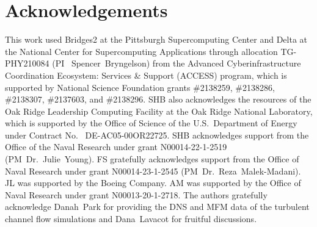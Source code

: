 \documentclass[11pt,sort&compress]{elsarticle}
\begin{document}
\section*{Acknowledgements}

This work used Bridges2 at the Pittsburgh Supercomputing Center and Delta at the National Center for Supercomputing Applications through allocation TG-PHY210084 (PI~ Spencer~Bryngelson) from the Advanced Cyberinfrastructure Coordination Ecosystem: Services \& Support (ACCESS) program, which is supported by National Science Foundation grants \#2138259, \#2138286, \#2138307, \#2137603, and \#2138296.
SHB also acknowledges the resources of the Oak Ridge Leadership Computing Facility at the Oak Ridge National Laboratory, which is supported by the Office of Science of the U.S.\ Department of Energy under Contract No.~ DE-AC05-00OR22725. 
SHB acknowledges support from the Office of the Naval Research under grant N00014-22-1-2519 (PM~Dr.~Julie~Young).
FS gratefully acknowledges support from the Office of Naval Research under grant N00014-23-1-2545 (PM~Dr.~Reza~Malek-Madani).
JL was supported by the Boeing Company. 
AM was supported by the Office of Naval Research under grant N00013-20-1-2718. 
The authors gratefully acknowledge Danah~Park for providing the DNS and MFM data of the turbulent channel flow simulations and Dana~Lavacot for fruitful discussions.



\end{document}
